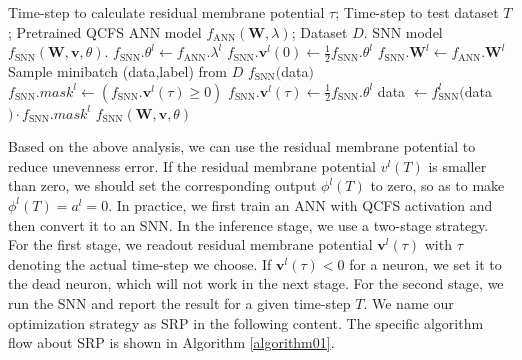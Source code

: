 \documentclass[letterpaper]{article} %
\begin{document}
\begin{algorithm}[t]
    \caption{The optimization strategy based on residual membrane potential (SRP)}
    \begin{algorithmic}[1]
        \REQUIRE Time-step to calculate residual membrane potential $\tau$; Time-step to test dataset $T$; Pretrained QCFS ANN model $f_\text{ANN}(\boldsymbol{W},\lambda)$; Dataset $D$.
        \ENSURE SNN model $f_\text{SNN}(\boldsymbol{W},\boldsymbol{v},\theta)$.
            \STATE $f_\text{SNN}.{\theta}^l\gets f_\text{ANN}.\lambda^l$
            \STATE $f_\text{SNN}.\boldsymbol{v}^l(0)\gets\frac{1}{2}f_\text{SNN}.{\theta}^l$
            \STATE $f_\text{SNN}.\boldsymbol{W}^l\gets f_\text{ANN}.\boldsymbol{W}^l$
        \ENDFOR
            \STATE Sample minibatch (data,label) from $D$
                \STATE $f_\text{SNN}($data$)$
            \ENDFOR
                \STATE $f_\text{SNN}.{mask}^l \gets(f_\text{SNN}.\boldsymbol{v}^l(\tau)\geqslant 0)$
                \STATE $f_\text{SNN}.\boldsymbol{v}^l(\tau)\gets\frac{1}{2}f_\text{SNN}.{\theta}^l$
            \ENDFOR
                    \STATE data $\gets f_\text{SNN}^l($data$)\cdot f_\text{SNN}.{mask}^l$
                \ENDFOR
            \ENDFOR
        \ENDFOR
        \RETURN $f_\text{SNN}(\boldsymbol{W},\boldsymbol{v},\theta)$
    \end{algorithmic}
    \label{algorithm01}
\end{algorithm}






Based on the above analysis, we can use the residual membrane potential to reduce unevenness error. If the residual membrane potential ${v}^l(T)$ is smaller than zero, we should set the corresponding output $\phi^l(T)$ to zero, so as to make $\phi^l(T)={a}^l=0$.
In practice, we first train an ANN with QCFS activation and then convert it to an SNN. In the inference stage, we use a two-stage strategy. For the first stage, we readout residual membrane potential  $\boldsymbol{v}^l(\tau)$ with $\tau$ denoting the actual time-step we choose.
If $\boldsymbol{v}^l(\tau)<0$ for a neuron, we set it to the dead neuron, which will not work in the next stage.
For the second stage, we run the SNN and report the result for a given time-step $T$.
 We name our optimization strategy as SRP in the following content. The specific algorithm flow about SRP is shown in Algorithm \ref{algorithm01}.
\end{document}

